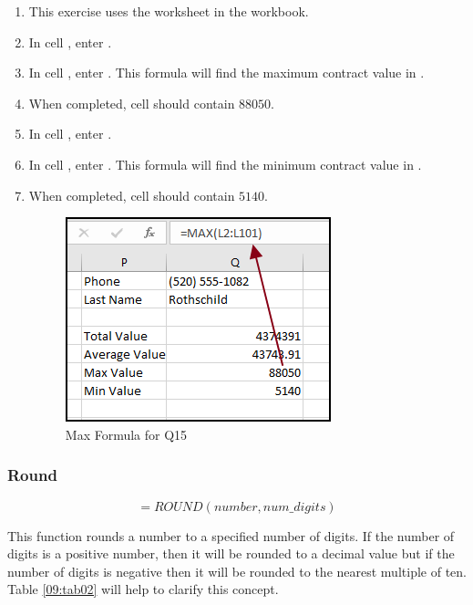 \begin{enumbox}
	\begin{enumerate}
		\item This exercise uses the  worksheet in the  workbook.
		\item In cell , enter .
		\item In cell , enter . This formula will find the maximum contract value in .
		\item When completed, cell  should contain $ 88050 $.
		\item In cell , enter .
		\item In cell , enter . This formula will find the minimum contract value in .
		\item When completed, cell  should contain $ 5140 $.
	
		\begin{figure}[H]
			\centering
			\includegraphics[width=\maxwidth{.75\linewidth}]{gfx/ch09_fig40}
			\caption{Max Formula for Q15}
			\label{09:fig40}
		\end{figure}
	
	\end{enumerate}
\end{enumbox}
	
\subsubsection{Round}

\[ =ROUND(number, num\_digits) \]

This function rounds a number to a specified number of digits. If the number of digits is a positive number, then it will be rounded to a decimal value but if the number of digits is negative then it will be rounded to the nearest multiple of ten. Table \ref{09:tab02} will help to clarify this concept.

